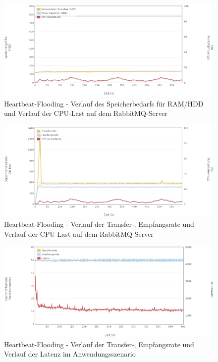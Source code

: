 \documentclass[	a4paper,
			11pt,
			titlepage,
			oneside,
			fleqn,
			listof=totoc,
			parskip,
			numbers=noenddot]{scrartcl}
\begin{document}
		\begin{figure}[!htb]
			\centering
			\includegraphics[width=\textwidth]{img/heartbeat/heartbeat_server1.png}
			\caption{Heartbeat-Flooding - Verlauf des Speicherbedarfs für RAM/HDD und Verlauf der CPU-Last auf dem RabbitMQ-Server}
			\label{fig:heartbeat-server1}
		\end{figure}
		
		\begin{figure}[!htb]
			\centering
			\includegraphics[width=\textwidth]{img/heartbeat/heartbeat_server2.png}
			\caption{Heartbeat-Flooding - Verlauf der Transfer-, Empfangsrate und Verlauf der CPU-Last auf dem RabbitMQ-Server}
			\label{fig:heartbeat-server2}
		\end{figure}
		
		\begin{figure}[!htb]
			\centering
			\includegraphics[width=\textwidth]{img/heartbeat/heartbeat_scenario.png}
			\caption{Heartbeat-Flooding - Verlauf der Transfer-, Empfangsrate und Verlauf der Latenz im Anwendungsszenario}
			\label{fig:heartbeat-scenario}
		\end{figure}
	
\end{document}
